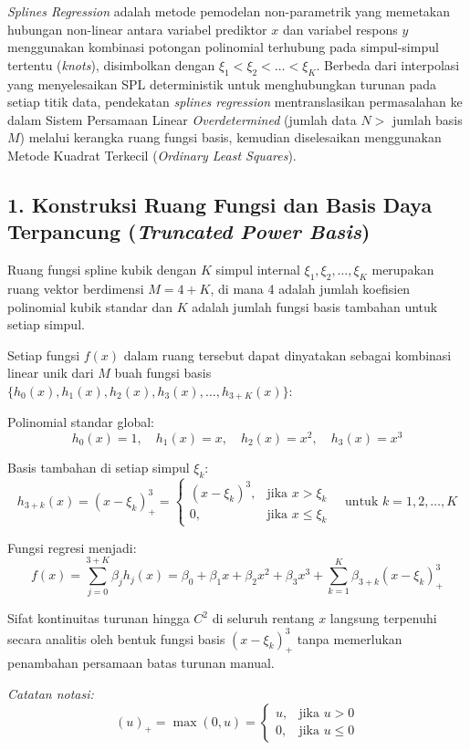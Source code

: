 \documentclass[12pt,a4paper]{report}
\begin{document}
\textit{Splines Regression} adalah metode pemodelan non-parametrik yang memetakan hubungan non-linear antara variabel prediktor $x$ dan variabel respons $y$ menggunakan kombinasi potongan polinomial terhubung pada simpul-simpul tertentu (\textit{knots}), disimbolkan dengan $\xi_1 < \xi_2 < \dots < \xi_K$. Berbeda dari interpolasi yang menyelesaikan SPL deterministik untuk menghubungkan turunan pada setiap titik data, pendekatan \textit{splines regression} mentranslasikan permasalahan ke dalam Sistem Persamaan Linear \textit{Overdetermined} (jumlah data $N >$ jumlah basis $M$) melalui kerangka ruang fungsi basis, kemudian diselesaikan menggunakan Metode Kuadrat Terkecil (\textit{Ordinary Least Squares}).

\subsection*{1. Konstruksi Ruang Fungsi dan Basis Daya Terpancung (\textit{Truncated Power Basis})}
Ruang fungsi spline kubik dengan $K$ simpul internal $\xi_1, \xi_2, \dots, \xi_K$ merupakan ruang vektor berdimensi $M = 4 + K$, di mana 4 adalah jumlah koefisien polinomial kubik standar dan $K$ adalah jumlah fungsi basis tambahan untuk setiap simpul.

Setiap fungsi $f(x)$ dalam ruang tersebut dapat dinyatakan sebagai kombinasi linear unik dari $M$ buah fungsi basis $\{h_0(x), h_1(x), h_2(x), h_3(x), \dots, h_{3+K}(x)\}$:

Polinomial standar global:
\[
h_0(x) = 1, \quad h_1(x) = x, \quad h_2(x) = x^2, \quad h_3(x) = x^3
\]

Basis tambahan di setiap simpul $\xi_k$:
\[
h_{3+k}(x) = (x - \xi_k)_+^3 = 
\begin{cases}
(x - \xi_k)^3, & \text{jika } x > \xi_k \\
0, & \text{jika } x \le \xi_k
\end{cases}
\quad \text{untuk } k = 1, 2, \dots, K
\]

Fungsi regresi menjadi:
\[
f(x) = \sum_{j=0}^{3+K} \beta_j h_j(x) = \beta_0 + \beta_1 x + \beta_2 x^2 + \beta_3 x^3 + \sum_{k=1}^{K} \beta_{3+k} (x - \xi_k)_+^3
\]

Sifat kontinuitas turunan hingga $C^2$ di seluruh rentang $x$ langsung terpenuhi secara analitis oleh bentuk fungsi basis $(x - \xi_k)_+^3$ tanpa memerlukan penambahan persamaan batas turunan manual.

\textit{Catatan notasi:}
\[
(u)_+ = \max(0, u) = 
\begin{cases}
u, & \text{jika } u > 0 \\
0, & \text{jika } u \le 0
\end{cases}
\]
\end{document}
